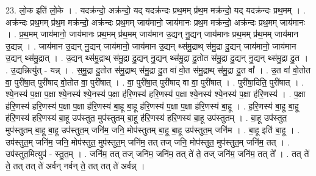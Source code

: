 \documentclass[17pt]{extarticle}
\begin{document}
23. लो॒क इति॑ लो॒के । . यदक्र॑न्दो॒ अक्र॑न्दो॒ यद् यदक्र॑न्दः प्रथ॒मम् प्र॑थ॒म मक्र॑न्दो॒ यद् यदक्र॑न्दः प्रथ॒मम् । . अक्र॑न्दः प्रथ॒मम् प्र॑थ॒म मक्र॑न्दो॒ अक्र॑न्दः प्रथ॒मम् जाय॑मानो॒ जाय॑मानः प्रथ॒म मक्र॑न्दो॒ अक्र॑न्दः प्रथ॒मम् जाय॑मानः । . प्र॒थ॒मम् जाय॑मानो॒ जाय॑मानः प्रथ॒मम् प्र॑थ॒मम् जाय॑मान उ॒द्यन् नु॒द्यन् जाय॑मानः प्रथ॒मम् प्र॑थ॒मम् जाय॑मान उ॒द्यन्न् । . जाय॑मान उ॒द्यन् नु॒द्यन् जाय॑मानो॒ जाय॑मान उ॒द्यन् थ्स॑मु॒द्राथ् स॑मु॒द्रा दु॒द्यन् जाय॑मानो॒ जाय॑मान उ॒द्यन् थ्स॑मु॒द्रात् । . उ॒द्यन् थ्स॑मु॒द्राथ् स॑मु॒द्रा दु॒द्यन् नु॒द्यन् थ्स॑मु॒द्रा दु॒तोत स॑मु॒द्रा दु॒द्यन् नु॒द्यन् थ्स॑मु॒द्रा दु॒त । . उ॒द्यन्नित्यु॑त् - यन्न् । . स॒मु॒द्रा दु॒तोत स॑मु॒द्राथ् स॑मु॒द्रा दु॒त वा॑ वो॒त स॑मु॒द्राथ् स॑मु॒द्रा दु॒त वा᳚ । . उ॒त वा॑ वो॒तोत वा॒ पुरी॑षा॒त् पुरी॑षाद् वो॒तोत वा॒ पुरी॑षात् । . वा॒ पुरी॑षा॒त् पुरी॑षाद् वा वा॒ पुरी॑षात् । . पुरी॑षा॒दिति॒ पुरी॑षात् । . श्ये॒नस्य॑ प॒क्षा प॒क्षा श्ये॒नस्य॑ श्ये॒नस्य॑ प॒क्षा ह॑रि॒णस्य॑ हरि॒णस्य॑ प॒क्षा श्ये॒नस्य॑ श्ये॒नस्य॑ प॒क्षा ह॑रि॒णस्य॑ । . प॒क्षा ह॑रि॒णस्य॑ हरि॒णस्य॑ प॒क्षा प॒क्षा ह॑रि॒णस्य॑ बा॒हू बा॒हू ह॑रि॒णस्य॑ प॒क्षा प॒क्षा ह॑रि॒णस्य॑ बा॒हू । . ह॒रि॒णस्य॑ बा॒हू बा॒हू ह॑रि॒णस्य॑ हरि॒णस्य॑ बा॒हू उप॑स्तुत॒ मुप॑स्तुतम् बा॒हू ह॑रि॒णस्य॑ हरि॒णस्य॑ बा॒हू उप॑स्तुतम् । . बा॒हू उप॑स्तुत॒ मुप॑स्तुतम् बा॒हू बा॒हू उप॑स्तुत॒म् जनि॑म॒ जनि॒ मोप॑स्तुतम् बा॒हू बा॒हू उप॑स्तुत॒म् जनि॑म । . बा॒हू इति॑ बा॒हू । . उप॑स्तुत॒म् जनि॑म॒ जनि॒ मोप॑स्तुत॒ मुप॑स्तुत॒म् जनि॑म॒ तत् तज् जनि॒ मोप॑स्तुत॒ मुप॑स्तुत॒म् जनि॑म॒ तत् । . उप॑स्तुत॒मित्युप॑ - स्तु॒त॒म् । . जनि॑म॒ तत् तज् जनि॑म॒ जनि॑म॒ तत् ते॑ ते॒ तज् जनि॑म॒ जनि॑म॒ तत् ते᳚ । . तत् ते॑ ते॒ तत् तत् ते॑ अर्वन् नर्वन् ते॒ तत् तत् ते॑ अर्वन्न् । \newline
\end{document}
